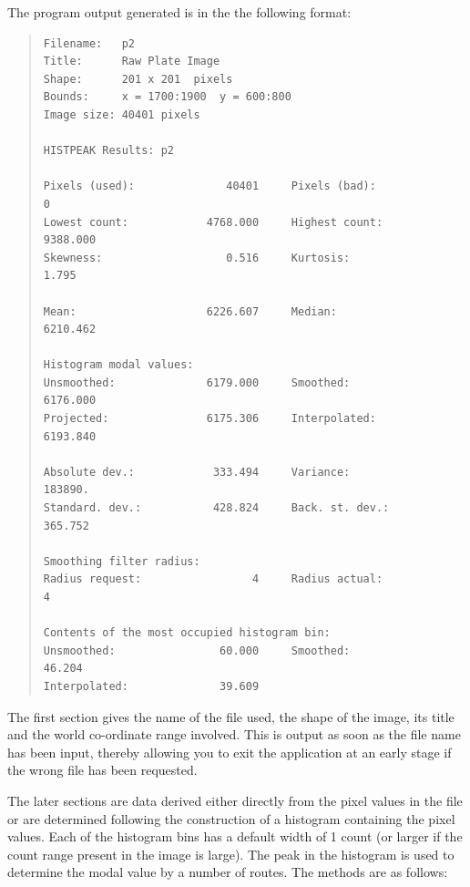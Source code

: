 \documentclass[twoside,11pt]{article}
\newenvironment{myquote}{\begin{quote}\begin{small}}{\end{small}\end{quote}}
\begin{document}
The program output generated is in the the following format:

\begin{myquote}
\begin{verbatim}
Filename:   p2
Title:      Raw Plate Image
Shape:      201 x 201  pixels
Bounds:     x = 1700:1900  y = 600:800
Image size: 40401 pixels

HISTPEAK Results: p2

Pixels (used):              40401     Pixels (bad):                0
Lowest count:            4768.000     Highest count:        9388.000
Skewness:                   0.516     Kurtosis:                1.795

Mean:                    6226.607     Median:               6210.462

Histogram modal values:
Unsmoothed:              6179.000     Smoothed:             6176.000
Projected:               6175.306     Interpolated:         6193.840

Absolute dev.:            333.494     Variance:              183890.
Standard. dev.:           428.824     Back. st. dev.:        365.752

Smoothing filter radius:
Radius request:                 4     Radius actual:               4

Contents of the most occupied histogram bin:
Unsmoothed:                60.000     Smoothed:               46.204
Interpolated:              39.609
\end{verbatim}
\end{myquote}

The first section gives the name of the file used, the shape of the image,
its title and the world co-ordinate range involved. This is output as soon as
the file name has been input, thereby allowing you to exit the application
at an early stage if the wrong file has been requested.

The later sections are data derived either directly from the pixel values
in the file or are determined following the construction of a histogram
containing the pixel values. Each of the histogram bins has a default 
width of 1 count (or larger if the count range present in the image is large).
The peak in the histogram is used to determine the modal
value by a number of routes. The methods are as follows:
\end{document}
